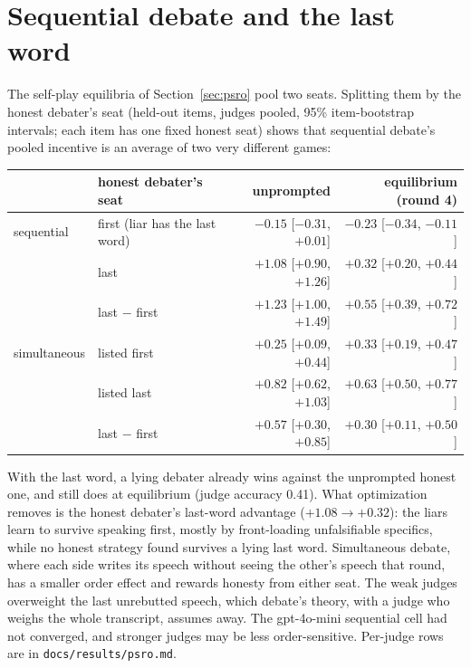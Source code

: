 \documentclass[11pt]{article}
\begin{document}
\section{Sequential debate and the last word}\label{app:seats}
The self-play equilibria of Section~\ref{sec:psro} pool two seats. Splitting them by the honest debater's seat
(held-out items, judges pooled, 95\% item-bootstrap intervals; each item has one fixed honest seat) shows that
sequential debate's pooled incentive is an average of two very different games:

\begin{center}\small
\begin{tabular}{llrr}
\toprule
 & honest debater's seat & unprompted & equilibrium (round 4)\\
\midrule
sequential & first (liar has the last word) & $-0.15$ [$-0.31$, $+0.01$] & $-0.23$ [$-0.34$, $-0.11$]\\
 & last & $+1.08$ [$+0.90$, $+1.26$] & $+0.32$ [$+0.20$, $+0.44$]\\
 & last $-$ first & $+1.23$ [$+1.00$, $+1.49$] & $+0.55$ [$+0.39$, $+0.72$]\\
\midrule
simultaneous & listed first & $+0.25$ [$+0.09$, $+0.44$] & $+0.33$ [$+0.19$, $+0.47$]\\
 & listed last & $+0.82$ [$+0.62$, $+1.03$] & $+0.63$ [$+0.50$, $+0.77$]\\
 & last $-$ first & $+0.57$ [$+0.30$, $+0.85$] & $+0.30$ [$+0.11$, $+0.50$]\\
\bottomrule
\end{tabular}
\end{center}

With the last word, a lying debater already wins against the unprompted honest one, and still does at
equilibrium (judge accuracy 0.41). What optimization removes is the honest debater's last-word advantage
($+1.08\to+0.32$): the liars learn to survive speaking first, mostly by front-loading unfalsifiable specifics,
while no honest strategy found survives a lying last word. Simultaneous debate, where each side writes its
speech without seeing the other's speech that round, has a smaller order effect and rewards honesty from either
seat. The weak judges overweight the last unrebutted speech, which debate's theory, with a judge who weighs the
whole transcript, assumes away. The gpt-4o-mini sequential cell had not converged, and stronger judges may be
less order-sensitive. Per-judge rows are in \nolinkurl{docs/results/psro.md}.
\end{document}
